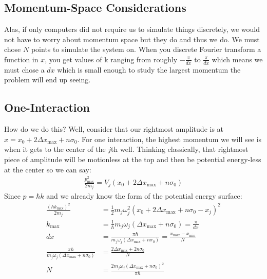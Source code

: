 \subsection{Momentum-Space Considerations  }
Alas, if only computers did not require us to simulate things discretely, we would not have to worry about momentum space but they do and thus we do.  We must chose $N$ points to simulate the system on.  When you discrete Fourier transform a function in $x$, you get values of k ranging from roughly $-\frac{\pi}{ dx}$ to $\frac{\pi}{dx}$ which means we must chose a $dx$ which is small enough to study the largest momentum the problem will end up seeing.
\subsection{One-Interaction}
How do we do this?  Well, consider that our rightmost amplitude is at $x = x_0 + 2 \Delta x_{\max} + n \sigma_0$.  For one interaction, the highest momentum we will see is when it gets to the center of the $j$th well.  Thinking classically, that rightmost piece of amplitude will be motionless at the top and then be potential energy-less at the center so we can say:
\begin{align}
	\frac{p_{\max}^2}{2 m_j} = V_j(x_0 + 2 \Delta x_{\max} + n \sigma_0)
\end{align}
Since $p = \hbar k$ and we already know the form of the potential energy surface:
\begin{align}
	\frac{\left( \hbar k_{\max} \right)^2}{2 m_j} &= \frac{1}{2} m_j \omega_j^2 \left(x_0 + 2 \Delta x_{\max} + n \sigma_0 - x_j \right)^2 \\
	k_{\max} &= \frac{1}{\hbar} m_j \omega_j \left( \Delta x_{\max} + n \sigma_0\right) = \frac{\pi}{dx} \\
	dx &= \frac{\pi \hbar}{m_j \omega_j \left( \Delta x_{\max} + n \sigma_0\right)} = \frac{x_{max} - x_{\min}}{N} \\
	\frac{\pi \hbar}{m_j \omega_j \left( \Delta x_{\max} + n \sigma_0\right)} &= \frac{2 \Delta x_{\max} + 2n \sigma_0}{N}	\\
	N &= \frac{2 m_j \omega_j \left( \Delta x_{\max} + n \sigma_0\right)^2 }{\pi \hbar}
\end{align}


